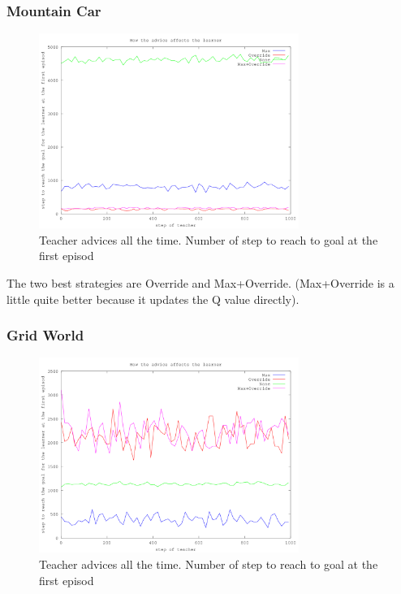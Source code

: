 \documentclass[a4paper,12pt]{article}
\begin{document}
      \subsubsection{Mountain Car}
      \begin{figure}[H]
      \begin{center}
	\includegraphics[width=320px]{graphA_MA}
	\caption{ Teacher advices all the time. Number of step to reach to goal at the first episod }
	\end{center}
      \end{figure}
      
      The two best strategies are Override and Max+Override. (Max+Override is a little quite better because it
      updates the Q value directly).
      
      \subsubsection{Grid World}
      \begin{figure}[H]
      \begin{center}
	\includegraphics[width=320px]{graphA_GA}
	\caption{ Teacher advices all the time. Number of step to reach to goal at the first episod }
	\end{center}
      \end{figure}
      
\end{document}
